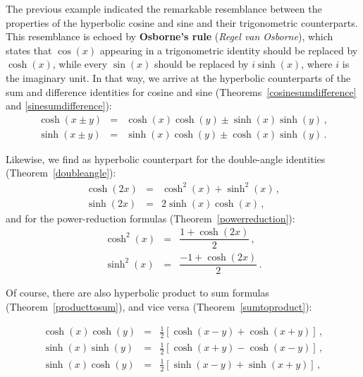 The previous example indicated the remarkable resemblance between the properties of the hyperbolic cosine and sine and their trigonometric counterparts. This resemblance is echoed by \textbf{Osborne's rule} (\textit{Regel van Osborne}), which states that $\cos(x)$ appearing in a trigonometric identity should be replaced by $\cosh(x)$, while every $\sin(x)$ should be replaced by $i\sinh(x)$, where $i$ is the imaginary unit. In that way, we arrive at the hyperbolic counterparts of the sum and difference identities for cosine and sine (Theorems~\ref{cosinesumdifference} and \ref{sinesumdifference}):    
\begin{eqnarray} 
\cosh(x \pm y) &=& \cosh(x) \cosh(y) \pm \sinh(x) \sinh(y)\,, \label{coshsumdifference}\\[0.2cm]
\sinh(x \pm y) &=& \sinh(x) \cosh(y) \pm \cosh(x) \sinh(y)\,. \label{sinhsumdifference}
\end{eqnarray}

Likewise, we find as hyperbolic counterpart for the double-angle identities (Theorem~\ref{doubleangle}):
\begin{eqnarray}
\cosh(2x) &=& \cosh^{2}(x) + \sinh^{2}(x)\,,\\[0.2cm]
\sinh(2x) &=&2\sinh(x)\cosh(x)\,,
\end{eqnarray}
and for the power-reduction formulas (Theorem~\ref{powerreduction}): 
\begin{eqnarray}
\cosh^{2}(x) &=& \dfrac{1 + \cosh(2x)}{2}\,,\\[0.2cm]
\sinh^{2}(x) &=& \dfrac{-1 + \cosh(2x)}{2}\,.
\end{eqnarray}

Of course, there are also hyperbolic product to sum formulas (Theorem~\ref{producttosum}), and vice versa (Theorem~\ref{sumtoproduct}): 

\begin{eqnarray}
\cosh(x)\cosh(y) &=& \frac{1}{2} \left[ \cosh(x - y) + \cosh(x + y)\right]\,,\\[0.2cm]
\sinh(x)\sinh(y) &=& \frac{1}{2} \left[ \cosh(x + y) - \cosh(x - y)\right]\,,\\[0.2cm]
\sinh(x)\cosh(y) &=& \frac{1}{2} \left[ \sinh(x - y) + \sinh(x + y)\right]\,,
\end{eqnarray}


